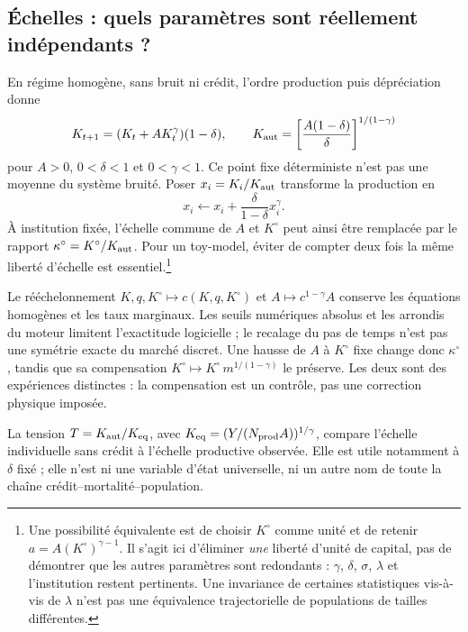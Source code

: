 \subsection{Échelles : quels paramètres sont réellement indépendants ?}
\label{sec:parametres_reduits}
En régime homogène, sans bruit ni crédit, l'ordre production puis
dépréciation donne
\[
 K_{t+1}=(K_t+A K_t^\gamma)(1-\delta),\qquad
 K_{\rm aut}=\left[\frac{A(1-\delta)}{\delta}\right]^{1/(1-\gamma)}
\]
pour $A>0$, $0<\delta<1$ et $0<\gamma<1$. Ce point fixe déterministe n'est
pas une moyenne du système bruité. Poser $x_i=K_i/K_{\rm aut}$ transforme
la production en
\[
 x_i\longleftarrow x_i+\frac{\delta}{1-\delta}x_i^\gamma .
\]
À institution fixée, l'échelle commune de $A$ et $K^\circ$ peut ainsi être remplacée
par le rapport $\kappa^\circ=K^\circ/K_{\rm aut}$. Pour un toy-model, éviter de compter
deux fois la même liberté d'échelle est essentiel.\footnote{Une possibilité
équivalente est de choisir $K^\circ$ comme unité et de retenir
$a=A (K^\circ)^{\gamma-1}$. Il s'agit ici d'éliminer \emph{une} liberté d'unité de
capital, pas de démontrer que les autres paramètres sont redondants :
$\gamma$, $\delta$, $\sigma$, $\lambda$ et l'institution restent pertinents.
Une invariance de certaines statistiques vis-à-vis de $\lambda$ n'est pas une
équivalence trajectorielle de populations de tailles différentes.}

Le rééchelonnement $K,q,K^\circ\mapsto c(K,q,K^\circ)$ et
$A\mapsto c^{1-\gamma}A$ conserve les équations homogènes et les taux
marginaux. Les seuils numériques absolus et les arrondis du moteur limitent
l'exactitude logicielle ; le recalage du pas de temps n'est pas une symétrie
exacte du marché discret. Une hausse de $A$ à $K^\circ$ fixe change donc
$\kappa^\circ$, tandis que sa compensation $K^\circ\mapsto
K^\circ\,m^{1/(1-\gamma)}$ le préserve. Les deux sont des expériences distinctes :
la compensation est un contrôle, pas une correction physique imposée.

La tension $T=K_{\rm aut}/K_{\rm eq}$, avec
$K_{\rm eq}=(Y/(N_{\rm prod}A))^{1/\gamma}$, compare l'échelle individuelle
sans crédit à l'échelle productive observée. Elle est utile notamment à
$\delta$ fixé ; elle n'est ni une variable d'état universelle, ni un autre nom
de toute la chaîne crédit--mortalité--population.
